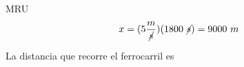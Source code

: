 \documentclass[%
final,
total,
slideBW,
colorBG,
pdf,
accumulate,
]{prosper}
\begin{document}
\begin{slide}{MRU}
% 
{\large
\begin{equation}
x=
(5\frac{m}{\cancel{s}})
(1800~\cancel{s})=
9000~m
\end{equation}}

                               
 
La distancia que recorre el ferrocarril es

                                                             
                                                               
                                                               
                                                               
\end{slide}


\end{document}
